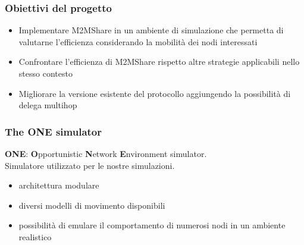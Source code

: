 \documentclass{beamer}
\begin{document}
\begin{frame}
\label{Obiettivi}
\frametitle{Obiettivi del progetto}
\begin{itemize}
\item Implementare M2MShare in un ambiente di simulazione che permetta di valutarne l'efficienza considerando la mobilità dei nodi interessati
\item Confrontare l'efficienza di M2MShare rispetto altre strategie applicabili nello stesso contesto
\item Migliorare la versione esistente del protocollo aggiungendo la possibilità di delega multihop
\end{itemize}
\end{frame}


\begin{frame}
\label{ONE}
\frametitle{The ONE simulator}
\textbf{ONE}: \textbf{O}pportunistic \textbf{N}etwork \textbf{E}nvironment simulator.\\
Simulatore utilizzato per le nostre simulazioni.
\begin{itemize}
\item architettura modulare
\item diversi modelli di movimento disponibili
\item possibilità di emulare il comportamento di numerosi nodi in un ambiente realistico
\end{itemize}


\end{frame}
\end{document}
